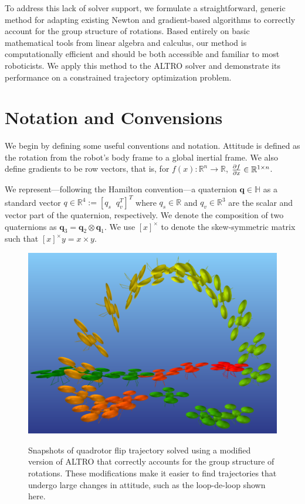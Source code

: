 \documentclass[letterpaper, 10 pt, conference]{ieeeconf}  %
\newcommand{\R}{\mathbb{R}}
\newcommand{\skewmat}[1]{[#1]^\times}
\newcommand{\q}{\textbf{q}}
\begin{document}
    To address this lack of solver support, we formulate a straightforward, generic
    method for adapting existing Newton and gradient-based algorithms to correctly
    account for the group structure of rotations. Based entirely on basic mathematical
    tools from linear algebra and calculus, our method is computationally efficient and
    should be both accessible and familiar to most roboticists. We apply this method to
    the ALTRO solver \cite{howell2019altro} and demonstrate its performance on a 
    constrained trajectory optimization problem.

\section{Notation and Convensions}

    We begin by defining some useful conventions and notation. 
    Attitude is defined as the rotation from the robot's body frame to a global inertial 
        frame. 
    We also define gradients to be row vectors, that is, for 
        $f(x) : \R^n \to \R$, $\pdv{f}{x} \in \R^{1\times n}$.

    We represent---following the Hamilton convention---a quaternion $\q \in \mathbb{H}$
    as a standard vector $q \in \R^4 := [q_s \;\; q_v^T]^T$ where $q_s \in \R$ and $q_v
    \in \R^3$ are the scalar and vector part of the quaternion, respectively. We denote
    the composition of two quaternions as $\q_3 = \q_2 \otimes \q_1$. We use
    $\skewmat{x}$ to denote the skew-symmetric matrix such that $\skewmat{x} y = x \times
    y$.
        
    \begin{figure}
        \centering
        \includegraphics[width=\columnwidth]{quadflip.png}
        \label{fig:quadflip}
        \caption{Snapshots of quadrotor flip trajectory solved using a modified version
        of ALTRO that correctly accounts for the group structure of rotations. These
        modifications make it easier to find trajectories that undergo large changes in
        attitude, such as the loop-de-loop shown here.}
    \end{figure}
\end{document}
